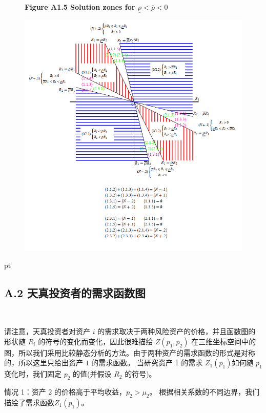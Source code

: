 \documentclass[10.0pt]{article}
\begin{document}

\newpage


\begin{figure}
\centerline{\bf Figure A1.5 \quad Solution zones for $ \underline{\rho} < \overline{\rho} < 0 $}
	\centering
	\includegraphics[width=1.1 \textwidth]{FigureA1.5.png}
\end{figure}
 pt


\newpage

\subsection*{A.2 \quad 天真投资者的需求函数图}

\quad \


请注意，天真投资者对资产 $i$ 的需求取决于两种风险资产的价格，并且函数图的形状随 $R_i$ 的符号的变化而变化，因此很难描绘 $ Z (p_1, p_2) $ 在三维坐标空间中的图，所以我们采用比较静态分析的方法。由于两种资产的需求函数的形式是对称的，所以这里只给出资产 $1$ 的需求函数。 当研究资产 1 的需求 $ Z_1 (p_1) $如何随 $ p_1 $ 变化时，我们固定 $ p_2 $ 的值(并假设 $ R_2 $ 的符号)。

情况 1：资产 2 的价格高于平均收益，$ p_2 > \mu_2 $。 根据相关系数的不同边界，我们描绘了需求函数$Z_1(p_1)$。
\end{document}
